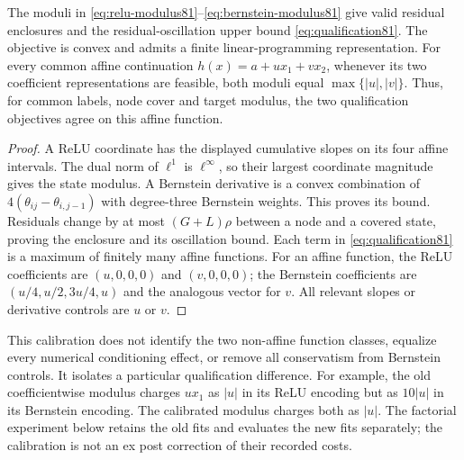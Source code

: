 \begin{proposition}\label{prop:calibration81}
The moduli in \eqref{eq:relu-modulus81}--\eqref{eq:bernstein-modulus81} give valid residual enclosures and the residual-oscillation upper bound \eqref{eq:qualification81}. The objective is convex and admits a finite linear-programming representation. For every common affine continuation $h(x)=a+u x_1+v x_2$, whenever its two coefficient representations are feasible, both moduli equal $\max\{|u|,|v|\}$. Thus, for common labels, node cover and target modulus, the two qualification objectives agree on this affine function.
\end{proposition}

\begin{proof}
A ReLU coordinate has the displayed cumulative slopes on its four affine intervals. The dual norm of $\ell^1$ is $\ell^\infty$, so their largest coordinate magnitude gives the state modulus. A Bernstein derivative is a convex combination of $4(\theta_{ij}-\theta_{i,j-1})$ with degree-three Bernstein weights. This proves its bound. Residuals change by at most $(G+L)\rho$ between a node and a covered state, proving the enclosure and its oscillation bound. Each term in \eqref{eq:qualification81} is a maximum of finitely many affine functions. For an affine function, the ReLU coefficients are $(u,0,0,0)$ and $(v,0,0,0)$; the Bernstein coefficients are $(u/4,u/2,3u/4,u)$ and the analogous vector for $v$. All relevant slopes or derivative controls are $u$ or $v$.
\end{proof}

This calibration does not identify the two non-affine function classes, equalize every numerical conditioning effect, or remove all conservatism from Bernstein controls. It isolates a particular qualification difference. For example, the old coefficientwise modulus charges $ux_1$ as $|u|$ in its ReLU encoding but as $10|u|$ in its Bernstein encoding. The calibrated modulus charges both as $|u|$. The factorial experiment below retains the old fits and evaluates the new fits separately; the calibration is not an ex post correction of their recorded costs.

